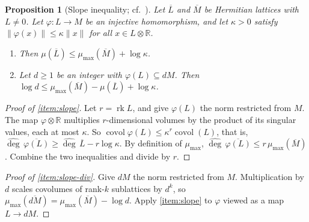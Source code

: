 \documentclass[11pt]{amsbook}
\theoremstyle{plain}
\newtheorem{proposition}[theorem]{Proposition}
\theoremstyle{definition}
\theoremstyle{remark}
\numberwithin{equation}{section}
\numberwithin{figure}{chapter}
\numberwithin{table}{chapter}
\newcommand{\R}{\mathbb{R}}
\newcommand{\rk}{\operatorname{rk}}
\newcommand{\degh}{\widehat{\deg}}
\newcommand{\covol}{\operatorname{covol}}
\begin{document}
\begin{proposition}[Slope inequality; cf.\ \cite{Bost1996}]
\label{prop:slope}
Let $\overline L$ and $\overline M$ be Hermitian lattices with
$L \ne 0$. Let $\varphi\colon L \to M$ be an injective homomorphism,
and let $\kappa > 0$ satisfy $\|\varphi(x)\| \le \kappa\|x\|$ for
all $x \in L\otimes\R$.
\begin{enumerate}[label=(\alph*), ref=\alph*]
\item\label{item:slope} Then
$\mu(\overline L) \le \mu_{\max}(\overline M) + \log \kappa$.
\item\label{item:slope-div} Let $d \ge 1$ be an integer with
$\varphi(L) \subseteq dM$. Then
$\log d \le \mu_{\max}(\overline M) - \mu(\overline L)
+ \log\kappa$.
\end{enumerate}
\end{proposition}

\begin{proof}[Proof of \eqref{item:slope}]
Let $r = \rk L$, and give $\varphi(L)$ the norm restricted from $M$.
The map $\varphi\otimes\R$ multiplies $r$-dimensional volumes by the
product of its singular values, each at most $\kappa$. So
$\covol\varphi(L) \le \kappa^r\covol(L)$, that is,
$\degh\,\overline{\varphi(L)} \ge \degh\,\overline L - r\log\kappa$.
By definition of $\mu_{\max}$,
$\degh\,\overline{\varphi(L)} \le r\,\mu_{\max}(\overline M)$.
Combine the two inequalities and divide by $r$.
\end{proof}

\begin{proof}[Proof of \eqref{item:slope-div}]
Give $dM$ the norm restricted from $M$. Multiplication by $d$ scales
covolumes of rank-$k$ sublattices by $d^k$, so
$\mu_{\max}(\overline{dM}) = \mu_{\max}(\overline M) - \log d$.
Apply \eqref{item:slope} to $\varphi$ viewed as a map $L \to dM$.
\end{proof}
\end{document}
